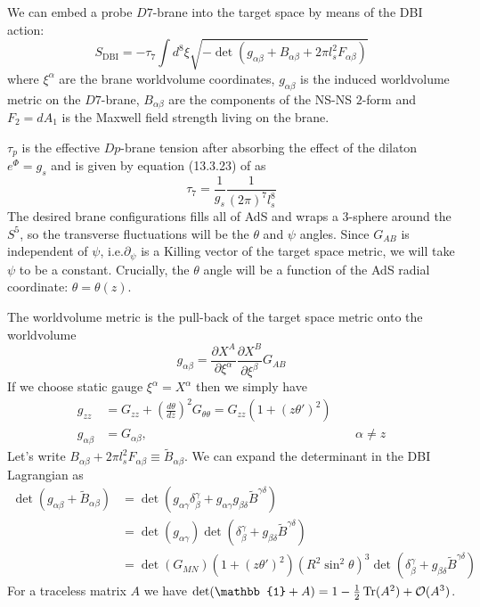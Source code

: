 \documentclass[aps,preprint,nofootinbib,preprintnumbers,eqsecnum,superscriptaddress]{revtex4}
\def\Tr{\mathop{\rm Tr}}
\begin{document}
\begin{appendix}
We can embed a probe $D7$-brane into the target space by means of the DBI action:
\begin{equation}
S_{\text{DBI}} = -\tau_7 \int{d^8\xi \sqrt{-\det\left(g_{\alpha \beta} + B_{\alpha \beta} + 2\pi l_s^2 F_{\alpha \beta}\right)}}
\end{equation}
where $\xi^\alpha$ are the brane worldvolume coordinates, $g_{\alpha \beta}$ is the induced worldvolume metric on the $D7$-brane, $B_{\alpha \beta}$ are the components of the NS-NS $2$-form and $F_2 = dA_1$ is the Maxwell field strength living on the brane.

$\tau_p$ is the effective $Dp$-brane tension after absorbing the effect of the dilaton $e^\Phi = g_s$ and is given by equation (13.3.23) of \cite{Polchinski:1998rr} as
\begin{equation}
	\tau_7 = \frac{1}{g_s}\frac{1}{(2\pi)^7 l_s^8}
\end{equation}
The desired brane configurations fills all of AdS and wraps a $3$-sphere around the $S^5$, so the transverse fluctuations will be the $\theta$ and $\psi$ angles. Since $G_{AB}$ is independent of $\psi$, i.e.$\partial_\psi$ is a Killing vector of the target space metric, we will take $\psi$ to be a constant. Crucially, the $\theta$ angle will be a function of the AdS radial coordinate: $\theta = \theta(z)$.

The worldvolume metric is the pull-back of the target space metric onto the worldvolume	
\begin{equation}
g_{\alpha \beta} = \frac{\partial X^A}{\partial \xi^\alpha} \frac{\partial X^B}{\partial \xi^\beta} G_{AB}
\end{equation}
If we choose static gauge $\xi^\alpha = X^\alpha$ then we simply have	
\begin{subequations}
	\begin{align}
	g_{zz} &= G_{zz} + \left(\frac{d \theta}{dz}\right)^2 G_{\theta \theta} = G_{zz}(1 + (z\theta')^2)	\\
	g_{\alpha\beta} &= G_{\alpha\beta}, \hspace{200pt} \alpha \neq z			
	\end{align}
\end{subequations}	
Let's write $B_{\alpha \beta} + 2\pi l_s^2 F_{\alpha \beta} \equiv \tilde{B}_{\alpha \beta}$. We can expand the determinant in the DBI Lagrangian as	
\begin{align*}
\det(g_{\alpha \beta} + \tilde{B}_{\alpha \beta})
& = \det(g_{\alpha \gamma} \delta^\gamma_\beta + g_{\alpha \gamma} g_{\beta \delta} \tilde{B}^{\gamma \delta})	\\
& = \det(g_{\alpha \gamma}) \det(\delta^\gamma_\beta + g_{\beta \delta} \tilde{B}^{\gamma \delta})	\\
& = \det(G_{MN})(1 + (z\theta')^2) (R^2 \sin^2{\theta})^3 \det(\delta^\gamma_\beta + g_{\beta \delta} \tilde{B}^{\gamma \delta})
\end{align*}
For a traceless matrix $A$ we have $\det(\mathbb{1} + A) = 1 - \frac{1}{2} \Tr(A^2) + \mathcal{O}(A^3)$.


\end{appendix}
\end{document}
